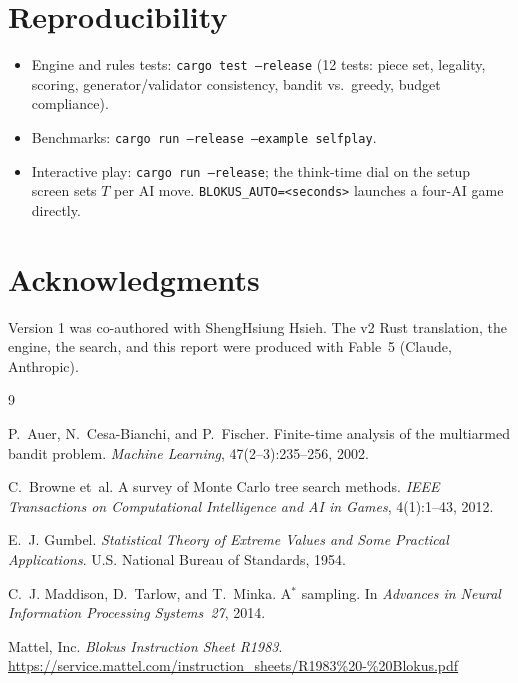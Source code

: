 \documentclass[11pt]{article}
\newcommand{\code}[1]{\texttt{#1}}
\begin{document}
\section{Reproducibility}

\begin{itemize}
  \item Engine and rules tests: \code{cargo test --release} (12 tests: piece
        set, legality, scoring, generator/validator consistency, bandit vs.\
        greedy, budget compliance).
  \item Benchmarks: \code{cargo run --release --example selfplay}.
  \item Interactive play: \code{cargo run --release}; the think-time dial on
        the setup screen sets $T$ per AI move. \code{BLOKUS\_AUTO=<seconds>}
        launches a four-AI game directly.
\end{itemize}

\section*{Acknowledgments}

Version 1 was co-authored with ShengHsiung Hsieh. The v2 Rust translation,
the engine, the search, and this report were produced with Fable~5
(Claude, Anthropic).

\begin{thebibliography}{9}

P.~Auer, N.~Cesa-Bianchi, and P.~Fischer.
\newblock Finite-time analysis of the multiarmed bandit problem.
\newblock \emph{Machine Learning}, 47(2--3):235--256, 2002.

C.~Browne et~al.
\newblock A survey of Monte Carlo tree search methods.
\newblock \emph{IEEE Transactions on Computational Intelligence and AI in
  Games}, 4(1):1--43, 2012.

E.~J. Gumbel.
\newblock \emph{Statistical Theory of Extreme Values and Some Practical
  Applications}.
\newblock U.S. National Bureau of Standards, 1954.

C.~J. Maddison, D.~Tarlow, and T.~Minka.
\newblock A$^*$ sampling.
\newblock In \emph{Advances in Neural Information Processing Systems~27},
  2014.

Mattel, Inc.
\newblock \emph{Blokus Instruction Sheet R1983}.
\newblock \url{https://service.mattel.com/instruction_sheets/R1983\%20-\%20Blokus.pdf}

\end{thebibliography}
\end{document}
